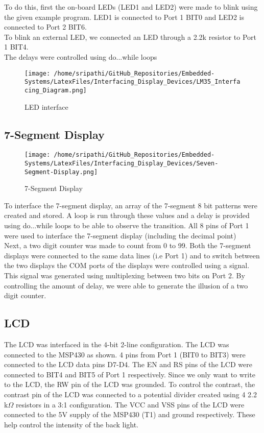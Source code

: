 \documentclass[12pt, letterpaper]{article}
\begin{document}
To do this, first the on-board LEDs (LED1 and LED2) were made to blink using the given example program. LED1 is connected to Port 1 BIT0 and LED2 is connected to Port 2 BIT6.\\
To blink an external LED, we connected an LED through a 2.2k resistor to Port 1 BIT4.\\
The delays were controlled using do...while loops

\begin{figure}[!h]
	\centering
	\texttt{[image: /home/sripathi/GitHub\_Repositories/Embedded-Systems/LatexFiles/Interfacing\_Display\_Devices/LM35\_Interfacing\_Diagram.png]}
	\caption{LED interface}
	\label{fig:ledInterface}
\end{figure}

\subsection{7-Segment Display}

\begin{wrapfigure}{r}{0.4\textwidth}
	\centering
	\texttt{[image: /home/sripathi/GitHub\_Repositories/Embedded-Systems/LatexFiles/Interfacing\_Display\_Devices/Seven-Segment-Display.png]}
	\label{fig:7segment}
	\caption{7-Segment Display}
\end{wrapfigure}

To interface the 7-segment display, an array of the 7-segment 8 bit patterns were created and stored. A loop is run through these values and a delay is provided using do...while loops to be able to observe the transition. All 8 pins of Port 1 were used to interface the 7-segment display (including the decimal point)\\
Next, a two digit counter was made to count from 0 to 99. Both the 7-segment displays were connected to the same data lines (i.e Port 1) and to switch between the two displays the COM ports of the displays were controlled using a signal. This signal was generated using multiplexing between two bits on Port 2. By controlling the amount of delay, we were able to generate the illusion of a two digit counter.

\subsection{LCD}

The LCD was interfaced in the 4-bit 2-line configuration. The LCD was connected to the MSP430 as shown. 4 pins from Port 1 (BIT0 to BIT3) were connected to the LCD data pins D7-D4. The EN and RS pins of the LCD were connected to BIT4 and BIT5 of Port 1 respectively. Since we only want to write to the LCD, the RW pin of the LCD was grounded. To control the contrast, the contrast pin of the LCD was connected to a potential divider created using 4 2.2 k$\Omega$ resistors in a 3:1 configuration. The VCC and VSS pins of the LCD were connected to the 5V supply of the MSP430 (T1) and ground respectively. These help control the intensity of the back light.
\end{document}
